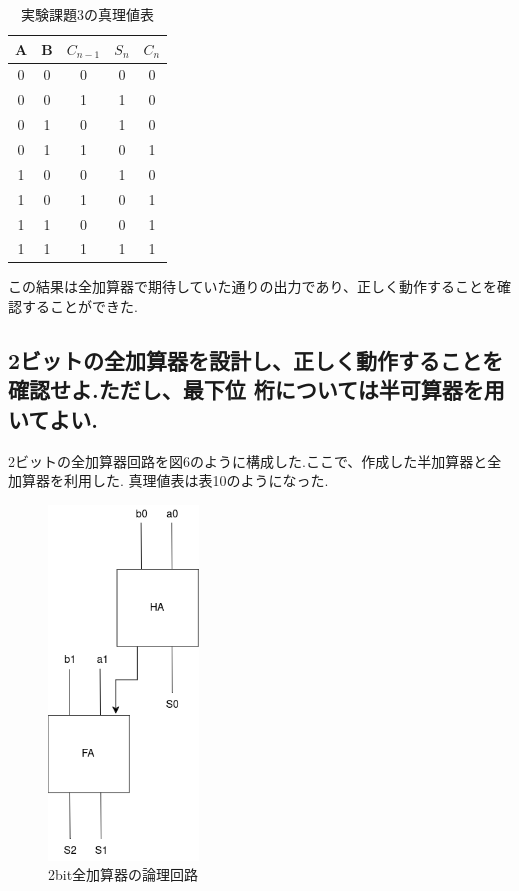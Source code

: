 \documentclass[titlepage]{jsarticle}
\theoremstyle{definition}
\begin{document}
\begin{table}[htbp]
	\caption{実験課題3の真理値表}
	\centering
	\begin{tabular}{|c|c|c||c|c|} \hline
		A & B & $C_{n-1}$ & $S_n$ & $C_n$ \\ \hline \hline
		0 & 0 & 0 & 0 & 0 \\ \hline
		0 & 0 & 1 & 1 & 0 \\ \hline
		0 & 1 & 0 & 1 & 0 \\ \hline
		0 & 1 & 1 & 0 & 1 \\ \hline
		1 & 0 & 0 & 1 & 0 \\ \hline
		1 & 0 & 1 & 0 & 1 \\ \hline
		1 & 1 & 0 & 0 & 1 \\ \hline
		1 & 1 & 1 & 1 & 1 \\ \hline
	\end{tabular}
\end{table}



この結果は全加算器で期待していた通りの出力であり、正しく動作することを確認することができた.


\subsection{2ビットの全加算器を設計し、正しく動作することを確認せよ.ただし、最下位
桁については半可算器を用いてよい.}

2ビットの全加算器回路を図6のように構成した.ここで、作成した半加算器と全加算器を利用した.
真理値表は表10のようになった.

\begin{figure}[htbp]
	\begin{center}
		\includegraphics[width=40mm]{2bitadd.png}
		\caption{2bit全加算器の論理回路}
	\end{center}
\end{figure}
\end{document}
